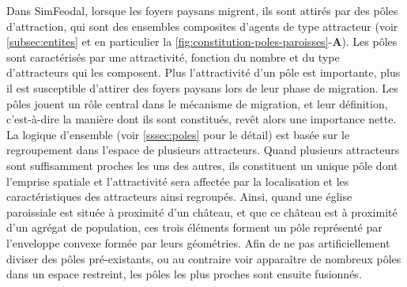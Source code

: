 \begin{tcolorbox}[breakable,left=0pt,right=0pt,top=0pt,bottom=0pt,
	colback=gray!15,colframe=gray!15,width=\dimexpr\textwidth\relax, 
	enlarge left by=0mm, boxsep=5pt,arc=0pt,outer arc=0pt]
	
Dans SimFeodal, lorsque les foyers paysans migrent, ils sont attirés par des pôles d'attraction, qui sont des ensembles composites d'agents de type attracteur (voir \cref{subsec:entites} et en particulier la \cref{fig:constitution-poles-paroisses}-\textbf{A}).
Les pôles sont caractérisés par une attractivité, fonction du nombre et du type d'attracteurs qui les composent.
Plus l'attractivité d'un pôle est importante, plus il est susceptible d'attirer des foyers paysans lors de leur phase de migration.
Les pôles jouent un rôle central dans le mécanisme de migration, et leur définition, c'est-à-dire la manière dont ils sont constitués, revêt alors une importance nette.
La logique d'ensemble (voir \cref{sssec:poles} pour le détail) est basée sur le regroupement dans l'espace de plusieurs attracteurs.
Quand plusieurs attracteurs sont suffisamment proches les uns des autres, ils constituent un unique pôle dont l'emprise spatiale et l'attractivité sera affectée par la localisation et les caractéristiques des attracteurs ainsi regroupés.
Ainsi, quand une église paroissiale est située à proximité\footnotemark{} d'un château, et que ce château est à proximité d'un agrégat de population, ces trois éléments forment un pôle représenté par l'enveloppe convexe formée par leurs géométries.
Afin de ne pas artificiellement diviser des pôles pré-existants, ou au contraire voir apparaître de nombreux pôles dans un espace restreint, les pôles les plus proches sont ensuite fusionnés.
\end{tcolorbox}
%
%
